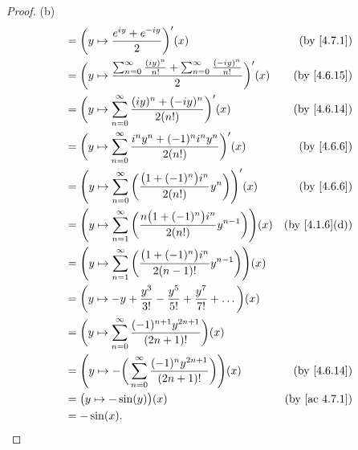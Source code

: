 \begin{proof}{(b)}
\begin{align*}
     & = \bigg(y \mapsto \frac{e^{i y} + e^{- i y}}{2}\bigg)'(x)                                                               & \text{(by \cref{4.7.1})}    \\
     & = \bigg(y \mapsto \frac{\sum_{n = 0}^\infty \frac{(i y)^n}{n!} + \sum_{n = 0}^\infty \frac{(- i y)^n}{n!}}{2}\bigg)'(x) & \text{(by \cref{4.6.15})}   \\
     & = \bigg(y \mapsto \sum_{n = 0}^\infty \frac{(i y)^n + (- i y)^n}{2 (n!)}\bigg)'(x)                                      & \text{(by \cref{4.6.14})}   \\
     & = \bigg(y \mapsto \sum_{n = 0}^\infty \frac{i^n y^n + (-1)^n i^n y^n}{2 (n!)}\bigg)'(x)                                 & \text{(by \cref{4.6.6})}    \\
     & = \Bigg(y \mapsto \sum_{n = 0}^\infty \bigg(\frac{\big(1 + (-1)^n\big) i^n}{2 (n!)} y^n\bigg)\Bigg)'(x)                 & \text{(by \cref{4.6.6})}    \\
     & = \Bigg(y \mapsto \sum_{n = 1}^\infty \bigg(\frac{n \big(1 + (-1)^n\big) i^n}{2 (n!)} y^{n - 1}\bigg)\Bigg)(x)          & \text{(by \cref{4.1.6}(d))} \\
     & = \Bigg(y \mapsto \sum_{n = 1}^\infty \bigg(\frac{\big(1 + (-1)^n\big) i^n}{2 (n - 1)!} y^{n - 1}\bigg)\Bigg)(x)                                      \\
     & = \bigg(y \mapsto -y + \frac{y^3}{3!} - \frac{y^5}{5!} + \frac{y^7}{7!} + \dots\bigg)(x)                                                              \\
     & = \bigg(y \mapsto \sum_{n = 0}^\infty \frac{(-1)^{n + 1} y^{2n + 1}}{(2n + 1)!}\bigg)(x)                                                              \\
     & = \Bigg(y \mapsto -\bigg(\sum_{n = 0}^\infty \frac{(-1)^n y^{2n + 1}}{(2n + 1)!}\bigg)\Bigg)(x)                         & \text{(by \cref{4.6.14})}   \\
     & = \big(y \mapsto -\sin(y)\big)(x)                                                                                       & \text{(by \cref{ac 4.7.1})} \\
     & = -\sin(x).
  \end{align*}
\end{proof}

